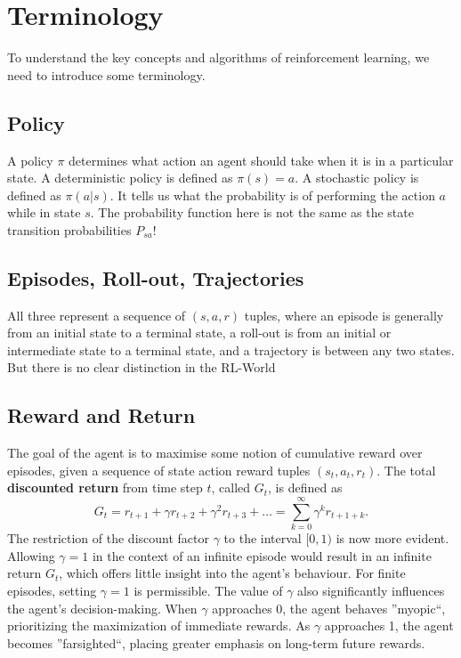 \section{Terminology}
To understand the key concepts and algorithms of reinforcement learning,
we need to introduce some terminology.

\subsection{Policy}
A policy $\pi$ determines what action an agent should take when it is in a 
particular state. A deterministic policy is defined as $\pi(s) = a$. A stochastic 
policy is defined as $\pi(a|s)$. It tells us what the probability 
is of performing the action $a$ while in state $s$. The probability function here 
is not the same as the state transition probabilities $P_{sa}$!

\subsection{Episodes, Roll-out, Trajectories}
All three represent a sequence of $(s, a, r)$ tuples, where an episode is 
generally from an initial state to a terminal state, a roll-out is from an initial 
or intermediate state to a terminal state, and a trajectory is between any two 
states. But there is no clear distinction in the RL-World  

\subsection{Reward and Return}
The goal of the agent is to maximise some notion of cumulative reward over episodes, given a sequence of 
state action reward tuples $(s_t, a_t, r_t)$. The total \textbf{discounted return} from time step $t$, called $G_t$, is defined as 
\begin{equation*}
    G_t = r_{t+1}+ \gamma r_{t+2} + \gamma^{2} r_{t+3} + \dots = \sum_{k=0}^{\infty} \gamma^{k} r_{t+1+k}.
\end{equation*}
The restriction of the discount factor $\gamma$ to the interval $[0, 1)$ is now more evident. Allowing $\gamma = 
1$ in the context of an infinite episode would result in an infinite return $G_t$, which offers little insight 
into the agent's behaviour. For finite episodes, setting $\gamma = 1$ is permissible. The value of $\gamma$ also significantly 
influences the agent's decision-making. When $\gamma$ approaches 0, the agent behaves ''myopic``, prioritizing 
the maximization of immediate rewards. As $\gamma$ approaches 1, the agent becomes ''farsighted``, placing 
greater emphasis on long-term future rewards.


